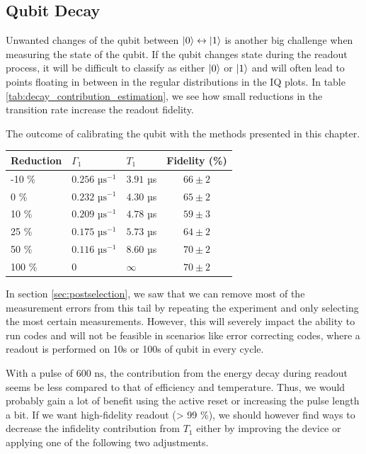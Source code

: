 \subsection{Qubit Decay}
Unwanted changes of the qubit between $\ket{0}\leftrightarrow\ket{1}$ is another big challenge when measuring the state of the qubit. If the qubit changes state during the readout process, it will be difficult to classify as either $\ket{0}$ or $\ket{1}$ and will often lead to points floating in between in the regular distributions in the IQ plots. In table \ref{tab:decay_contribution_estimation}, we see how small reductions in the transition rate increase the readout fidelity. 
\begin{margintable}
\centering
\caption{The outcome of calibrating the qubit with the methods presented in this chapter.}
\vspace{0.3 cm}
\begin{tabular}{lll|c}
\hline
\textbf{Reduction}         &  $\Gamma_1$                  &  $T_1$        & Fidelity (\%)\\ \hline
-10 \%                     &  $0.256 \text{ µs}^{-1}$         &  $3.91$ µs   &  $66 \pm 2$\\
0   \%                     &  $0.232 \text{ µs}^{-1}$         &  $4.30$ µs   &  $65 \pm 2$\\
10  \%                     &  $0.209 \text{ µs}^{-1}$         &  $4.78$ µs   &  $59 \pm 3$\\
25  \%                     &  $0.175 \text{ µs}^{-1}$         &  $5.73$ µs   &  $64 \pm 2$\\
50  \%                     &  $0.116 \text{ µs}^{-1}$         &  $8.60$ µs   &  $70 \pm 2$\\
100 \%                     &  $0$         &  $\infty$                       &  $70 \pm 2$\\
\end{tabular}
\label{tab:decay_contribution_estimation}
\end{margintable}
In section \ref{sec:postselection}, we saw that we can remove most of the measurement errors from this tail by repeating the experiment and only selecting the most certain measurements. However, this will severely impact the ability to run codes and will not be feasible in scenarios like error correcting codes, where a readout is performed on 10s or 100s of qubit in every cycle. 

With a pulse of $600 \text{ ns}$, the contribution from the energy decay during readout seems be less compared to that of efficiency and temperature. Thus, we would probably gain a lot of benefit using the active reset or increasing the pulse length a bit. If we want high-fidelity readout (> 99 \%), we should however find ways to decrease the infidelity contribution from $T_1$ either by improving the device or applying one of the following two adjustments.

